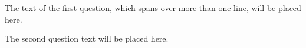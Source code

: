 \documentclass{article}
\theoremstyle{mystyle}
\begin{document}
 \begin{question}
  The text of the first question, which spans over more than one line, will be placed here.
 \end{question}
	  \lipsum[2]
  \begin{question}
The second question text will be placed here.
	  \end{question}
	  \lipsum[2]

  
\end{document}
